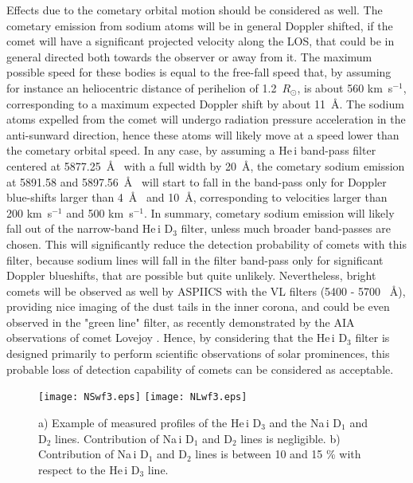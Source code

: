 \documentclass[namedreferences]{solarphysics}
\begin{document}
\begin{article}
Effects due to the cometary orbital motion should be considered as well. The cometary emission from sodium atoms will be in general Doppler shifted, 
if the comet will have a significant projected velocity along the LOS, that could be in general directed both towards the observer or away from it. 
The maximum possible speed for these bodies is equal to the free-fall speed that, by assuming for  instance an heliocentric distance of perihelion of 
1.2~$R_{\odot}$, is about 560 km~s$^{-1}$, corresponding to a maximum expected Doppler shift by about 11~\AA. The sodium atoms expelled from the comet 
will undergo radiation pressure acceleration in the anti-sunward direction, hence these atoms will likely move at a speed lower than the cometary orbital 
speed. In any case, by assuming a He\,{\sc i} band-pass filter centered at 5877.25~\AA~ with a full width by 20~\AA, the cometary sodium emission at 5891.58 
and 5897.56~\AA~ will start to fall in the band-pass only for Doppler blue-shifts larger than 4~\AA~ and 10~\AA, corresponding to velocities larger than 
200 km~s$^{-1}$ and 500 km~s$^{-1}$.
In summary, cometary sodium emission will likely fall out of the narrow-band He\,{\sc i} D$_{3}$ filter, unless much broader band-passes are chosen. 
This will significantly reduce the detection probability of comets with this filter, because sodium lines will fall in the filter band-pass only for 
significant Doppler blueshifts, that are possible but quite unlikely. Nevertheless, bright comets will be observed as well by ASPIICS with the VL filters 
(5400 - 5700 ~\AA), providing nice imaging of the dust tails in the inner corona, and could be even observed in the "green line" filter, as recently 
demonstrated by the AIA observations of comet Lovejoy  \cite{Mcc13}. Hence, by considering that the He\,{\sc i} D$_{3}$  filter is designed primarily to 
perform scientific observations of solar prominences, this probable loss of detection capability of comets can be considered as acceptable.

\begin{figure}    %
\centerline{ \vspace{0.005\textwidth}
\texttt{[image: NSwf3.eps]}
            \texttt{[image: NLwf3.eps]}
            }
\caption{a) Example of measured profiles of the He\,{\sc i} D$_{3}$ and the Na\,{\sc i} D$_{1}$ and D$_{2}$ lines. Contribution of Na\,{\sc i} D$_{1}$ and D$_{2}$ 
lines is negligible. b) Contribution of Na\,{\sc i} D$_{1}$ and D$_{2}$ lines is between 10 and 15 \% with respect to the He\,{\sc i} D$_{3}$ line.}
\label{f-nap}
\end{figure}


\end{article}
\end{document}

